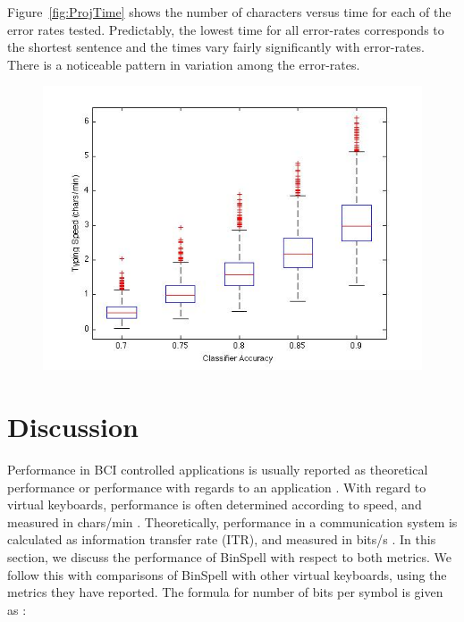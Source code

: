 \documentclass[12pt,titlepage]{article}
\begin{document}
Figure~\ref{fig:ProjTime} shows the number of characters versus time for each of the error rates tested. 
Predictably, the lowest time for all error-rates corresponds to the shortest sentence and the 
times vary fairly significantly with error-rates.  There is a noticeable pattern in variation among 
the error-rates.

\begin{figure}[t]
\begin{center}
	\includegraphics[scale=0.40]{ProjTypeSpeedComp.jpg}
	\label{fig:TypeSpeed}
\end{center}
\end{figure}

\section{Discussion}

Performance in BCI controlled applications is usually reported as theoretical performance or performance with regards to an application \cite{wolpaw_braincomputer_2002}.  With regard to virtual keyboards, performance is often determined according to speed, and measured in chars/min \cite{blankertz_berlin_2006} \cite{donchin_mental_2000} \cite{wolpaw_braincomputer_2002}.  Theoretically, performance in a communication system is calculated as information transfer rate (ITR), and measured in bits/s \cite{wolpaw_braincomputer_2002}.  In this section, we discuss the performance of BinSpell with respect to both metrics.  We follow this with comparisons of BinSpell with other virtual keyboards, using the metrics they have reported.  The formula for number of bits per symbol is given as \cite{mcfarland2003brain}\cite{kelly_visual_2005}:
\end{document}
